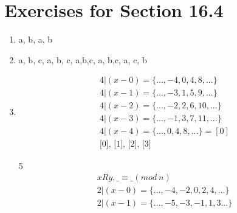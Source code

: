 \documentclass[12pt]{article}
\begin{document}
\section*{Exercises for Section 16.4}
\begin{enumerate}
    \item {{a, b}}, {{a}, {b}}
    \item {{a, b, c}}, {{a}, {b}, {c}}, {{a,b},{c}}, {{a}, {b,c}}, {{a, c}, {b}}
    \item 
	\begin{equation*}
		\begin{split}
		    4|(x-0) = \{..., -4, 0, 4,8,...\}\\
		    4|(x-1) = \{..., -3, 1, 5, 9,...\}\\
		    4|(x-2) = \{..., -2, 2, 6, 10, ...\}\\
		    4|(x-3) = \{..., -1, 3, 7, 11, ...\}\\
		    4|(x-4) = \{..., 0, 4, 8, ...\} = [0]\\
		    \text{{[0], [1], [2], [3]}}
		\end{split}
	\end{equation*}
    \item [5]
	\begin{equation*}
		\begin{split}
			xRy, \_ \equiv \_ (mod\ n)\\
			2|(x-0) = \{..., -4, -2, 0, 2, 4,...\}\\
			2|(x-1) = \{..., -5, -3, -1, 1, 3...\}\\
		\end{split}
	\end{equation*}
\end{enumerate}
\end{document}
